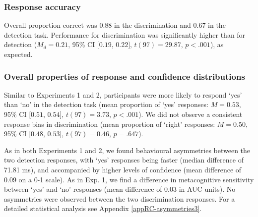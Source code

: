 \documentclass[12pt,twoside]{reedthesis}
\begin{document}
\hypertarget{response-accuracy-2}{%
\subsubsection{Response accuracy}\label{response-accuracy-2}}

Overall proportion correct was 0.88 in the discrimination and 0.67 in the detection task. Performance for discrimination was significantly higher than for detection (\(M_d = 0.21\), 95\% CI \([0.19\), \(0.22]\), \(t(97) = 29.87\), \(p < .001\)), as expected.

\hypertarget{overall-properties-of-response-and-confidence-distributions-1}{%
\subsubsection{Overall properties of response and confidence distributions}\label{overall-properties-of-response-and-confidence-distributions-1}}

Similar to Experiments 1 and 2, participants were more likely to respond `yes' than `no' in the detection task (mean proportion of `yes' responses: \(M = 0.53\), 95\% CI \([0.51\), \(0.54]\), \(t(97) = 3.73\), \(p < .001\)). We did not observe a consistent response bias in discrimination (mean proportion of `right' responses: \(M = 0.50\), 95\% CI \([0.48\), \(0.53]\), \(t(97) = 0.46\), \(p = .647\)).

As in both Experiments 1 and 2, we found behavioural asymmetries between the two detection responses, with `yes' responses being faster (median difference of 71.81 ms), and accompanied by higher levels of confidence (mean difference of 0.09 on a 0-1 scale). As in Exp. 1, we find a difference in metacognitive sensitivity between `yes' and `no' responses (mean difference of 0.03 in AUC units). No asymmetries were observed between the two discrimination responses. For a detailed statistical analysis see Appendix \ref{appRC-asymmetries3}.
\end{document}
